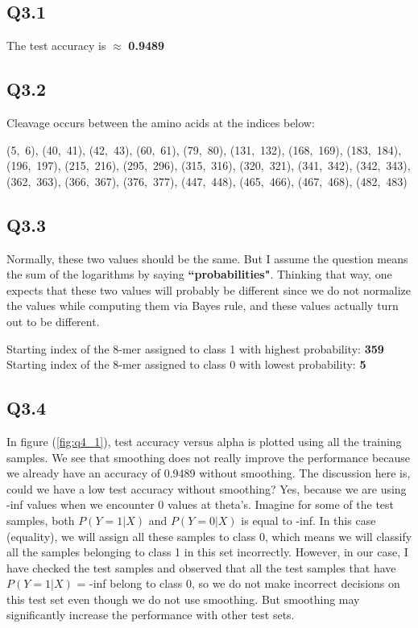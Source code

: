 \documentclass[12pt]{report}
\begin{document}
\subsection*{Q3.1}
The test accuracy is $\approx$ \textbf{0.9489}

\subsection*{Q3.2}
Cleavage occurs between the amino acids at the indices below:

(5,~6), (40,~41), (42,~43), (60,~61), (79,~80), (131,~132), (168,~169), (183,~184), (196,~197), (215,~216), (295,~296), (315,~316), (320,~321), (341,~342), (342,~343), (362,~363), (366,~367), (376,~377), (447,~448), (465,~466), (467,~468), (482,~483)

\subsection*{Q3.3}
Normally, these two values should be the same. But I assume the question means the sum of the logarithms by  saying \textbf{``probabilities"}. Thinking that way, one expects that these two values will probably be different since we do not normalize the values while computing them via Bayes rule, and these values actually turn out to be different.

Starting index of the 8-mer assigned to class 1 with highest probability: \textbf{359} \\
Starting index of the 8-mer assigned to class 0 with lowest probability: \textbf{5} 

\subsection*{Q3.4}
In figure (\ref{fig:q4_1}), test accuracy versus alpha is plotted using all the training samples. We see that smoothing does not really improve the performance because we already have an accuracy of 0.9489 without smoothing. The discussion here is, could we have a low test accuracy without smoothing? Yes, because we are using -inf values when we encounter 0 values at theta's. Imagine for some of the test samples, both $P(Y=1|X)$ and $P(Y=0|X)$ is equal to -inf. In this case (equality), we will assign all these samples to class 0, which means we will classify all the samples belonging to class 1 in this set incorrectly. However, in our case, I have checked the test samples and observed that all the test samples that have $P(Y=1|X)$ = -inf belong to class 0, so we do not make incorrect decisions on this test set even though we do not use smoothing. But smoothing may significantly increase the performance with other test sets.
\end{document}

